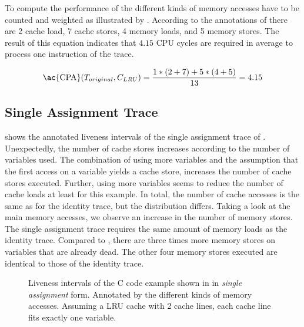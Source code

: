 \documentclass[onecolumn, openright, master, english, signatures]{dbrgrptt}
\begin{document}
To compute the performance of  the different kinds of memory accesses have to be counted and weighted as illustrated by .
According to the annotations of  there are 2 cache load, 7 cache stores, 4 memory loads, and 5 memory stores.
The result of this equation indicates that $4.15$ \ac{CPU} cycles are required in average to process one instruction of the \ac{trace}.

\begin{equation}\label{equ:trace-transformation-original-marked}
\text{\ac{CPA}}(T_{original}, C_{LRU}) = \frac{1 * (2 + 7) + 5 * (4 + 5)}{13} = 4.15
\end{equation}

\subsection{Single Assignment Trace}
 shows the annotated liveness intervals of the single assignment trace of .
Unexpectedly, the number of cache stores increases according to the number of variables used.
The combination of using more variables and the assumption that the first access on a variable yields a cache store, increases the number of cache stores executed.
Further, using more variables seems to reduce the number of cache loads at least for this example.
In total, the number of cache accesses is the same as for the identity \ac{trace}, but the distribution differs.
Taking a look at the main memory accesses, we observe an increase in the number of memory stores.
The single assignment \ac{trace} requires the same amount of memory loads as the identity \ac{trace}.
Compared to , there are three times more memory stores on variables that are already dead.
The other four memory stores executed are identical to those of the identity \ac{trace}.

\begin{figure}
  \centering
  
  \caption{Liveness intervals of the C code example shown in  in \emph{single assignment} form. Annotated by the different kinds of memory accesses. Assuming a \ac{LRU} cache with 2 cache lines, each cache line fits exactly one variable.}
  \label{fig:trace-transformation-sa-marked}
\end{figure}
\end{document}

